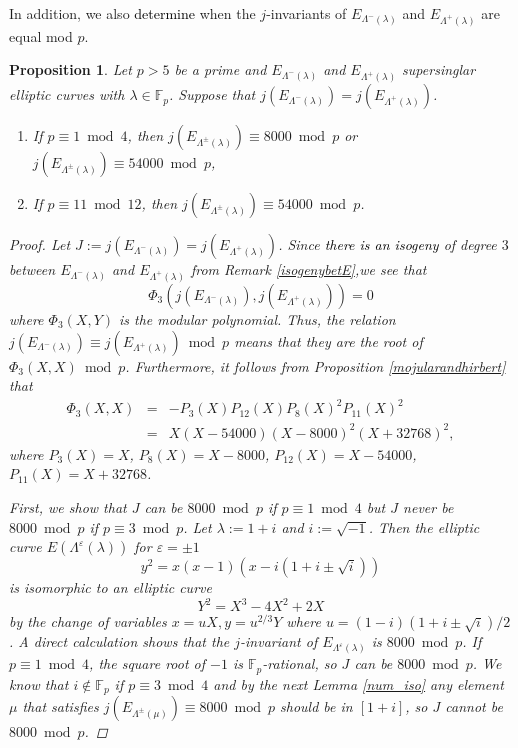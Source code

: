 \documentclass[a4paper, 11pt]{article}
\theoremstyle{plain}
\newtheorem{prop}[defn]{Proposition}
\newcommand{\?}{\textcolor{red}{??}}
\newcommand{\lm}{\lambda}
\newcommand{\Lm}{\Lambda}
\newcommand{\fp}{\mathbb{F}_p}
\begin{document}
In addition, we also \textcolor{black}{determine} when the $j$-invariants of $E_{\Lm^{-}(\lm)}$ and $E_{\Lm^{+}(\lm)}$ are equal mod $p$.
\begin{prop}
\label{whenfp}
    Let $p>5$ be a prime and $E_{\Lm^{-}(\lm)}$ and $E_{\Lm^{+}(\lm)}$  supersinglar elliptic curves with $\lm \in \fp$. 
    Suppose that $j(E_{\Lm^{-}(\lm)}) =j(E_{\Lm^{+}(\lm)})$. 

    \begin{enumerate}
        \item [\rm{(a)}] If $p \equiv 1 \bmod 4$, then $j(E_{\Lm^{\pm}(\lm)}) \equiv8000 \bmod p $ or $j(E_{\Lm^{\pm}(\lm)}) \equiv54000 \bmod p $,
        \item [\rm{(b)}] If $p \equiv 11 \bmod 12 $, then
        $j(E_{\Lm^{\pm}(\lm)}) \equiv54000 \bmod p$. 
    \end{enumerate}
    \begin{proof}
        Let $J:=j(E_{\Lm^{-}(\lm)}) =j(E_{\Lm^{+}(\lm)})$. Since \textcolor{black}{there is an isogeny} of degree $3$ between $E_{\Lm^{-}(\lm)}$ and $E_{\Lm^{+}(\lm)}$ from Remark \ref{isogenybetE},we see that 
        \[
        \Phi_3(j(E_{\Lm^{-}(\lm)}),j(E_{\Lm^{+}(\lm)}))=0\]
         where $\Phi_3(X,Y) $ is the modular polynomial. Thus, the relation $j(E_{\Lm^{-}(\lm)}) \equiv j(E_{\Lm^{+}(\lm)})\bmod p$ means that they are the root of $\Phi_3(X,X) \bmod p$. Furthermore, it follows from Proposition \ref{mojularandhirbert} that 
\begin{eqnarray*}
\Phi_3(X,X) &=& -P_3(X)P_{12}(X)P_8(X)^2P_{11}(X)^2\\
&=& X(X-54000)(X-8000)^2(X+32768)^2,
\end{eqnarray*}
where $P_3(X)=X$, $P_8(X)=X-8000$, $P_{12}(X)=X-54000$, $P_{11}(X)=X+32768$. 

First, we show that $J$ can be $8000 \bmod p$ if $p \equiv1 \bmod 4$ but $J$ never be $8000 \bmod p$ if $p \equiv3 \bmod p$. 
Let $\lm:=1+i$ and $i:=\sqrt{-1}$. Then the elliptic curve $E(\Lm^{\varepsilon}(\lm))$ for $\varepsilon=\pm1$ 
 \[
 y^2=x(x-1)(x-i(1+i\pm\sqrt{i}))
 \]
is isomorphic to an elliptic curve
\[
Y^2=X^3-4X^2+2X
\]
by the change of variables  $x=uX,y=u^{2/3}Y$ where $u=(1-i)(1+i\pm\sqrt{i})/2$. A direct calculation shows that the $j$-invariant of $E_{\Lm^{\varepsilon}(\lm)}$ is $8000 \bmod p$. If $p \equiv 1\bmod 4$, the square root of $-1$ is $\fp$-rational, so $J$ can be $8000 \bmod p$. We know that $i \notin\fp$ if $p \equiv 3\bmod 4$ and by the next Lemma \ref{num_iso} any element $\mu$ that satisfies $j(E_{\Lm^{\pm}(\mu)})\equiv 8000 \bmod p$ should be in $[1+i]$, so $J$ cannot be $8000 \bmod p$. 


\end{proof}
\end{prop}
\end{document}
